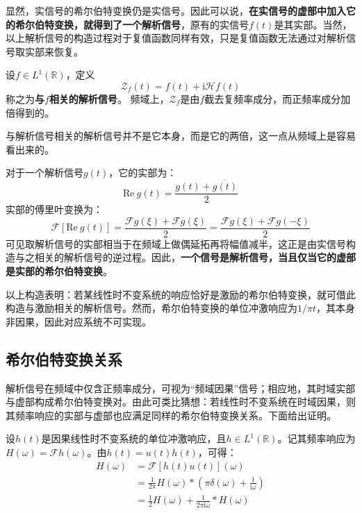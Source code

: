 显然，实信号的希尔伯特变换仍是实信号。因此可以说，\textbf{在实信号的虚部中加入它的希尔伯特变换，就得到了一个解析信号}，原有的实信号$f(t)$是其实部。当然，以上解析信号的构造过程对于复值函数同样有效，只是复值函数无法通过对解析信号取实部来恢复。

\begin{definition}
    设$f\in L^1(\mathbb{R})$，定义
    $$\mathcal{Z}_f(t)=f(t)+\mathrm{i}\mathcal{H} f(t)$$
    称之为\textbf{与}$f$\textbf{相关的解析信号}。
    频域上，$\mathcal{Z} _f$是由$f$截去复频率成分，而正频率成分加倍得到的。
\end{definition}

与解析信号相关的解析信号并不是它本身，而是它的两倍，这一点从频域上是容易看出来的。

对于一个解析信号$g(t)$，它的实部为：
$$\text{Re}\ g(t)=\frac{g(t)+\overline{g(t)}}{2}$$
实部的傅里叶变换为：
$$\mathcal{F}[\text{Re}\ g(t)]=\frac{\mathcal{F}g(\xi)+\mathcal{F}\overline{g}(\xi)}{2}=\frac{\mathcal{F}g(\xi)+\mathcal{F}g(-\xi)}{2}$$
可见取解析信号的实部相当于在频域上做偶延拓再将幅值减半，这正是由实信号构造与之相关的解析信号的逆过程。因此，\textbf{一个信号是解析信号，当且仅当它的虚部是实部的希尔伯特变换}。

以上构造表明：若某线性时不变系统的响应恰好是激励的希尔伯特变换，就可借此构造与激励相关的解析信号。然而，希尔伯特变换的单位冲激响应为$1/\pi t$，其本身非因果，因此对应系统不可实现。

\subsection{希尔伯特变换关系}\label{sub:hilbert_relation}

解析信号在频域中仅含正频率成分，可视为“频域因果”信号；相应地，其时域实部与虚部构成希尔伯特变换对。由此可类比猜想：若线性时不变系统在时域因果，则其频率响应的实部与虚部也应满足同样的希尔伯特变换关系。下面给出证明。

设$h(t)$是因果线性时不变系统的单位冲激响应，且$h\in L^1(\mathbb{R})$。记其频率响应为$H(\omega)=\mathcal{F}h(\omega)$。由$h(t)=u(t)h(t)$，可得：
\begin{align*}
    H(\omega)&=\mathcal{F} [h(t)u(t)](\omega)\\
    &=\frac{1}{2\pi}H(\omega)*\left(\pi\delta(\omega)+\frac{1}{\mathrm{i}\omega}\right)\\
    &=\frac{1}{2}H(\omega)+\frac{1}{2\pi \mathrm{i}\omega}*H(\omega)
\end{align*}

